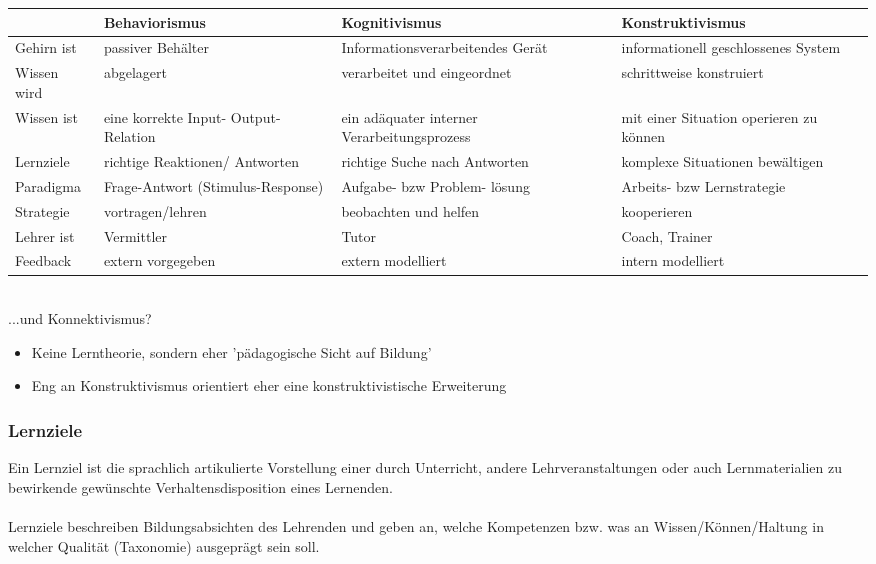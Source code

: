 \documentclass[a4paper]{article}
\begin{document}
\begin{tabular}{ p{2cm} p{4cm} p{4cm} p{4cm} }\toprule[1.5pt]			
	& \bf Behaviorismus
	& \bf Kognitivismus
	& \bf Konstruktivismus
	\\ \midrule
	
	Gehirn ist 				
	& passiver Behälter		   	
	& Informationsverarbeitendes Gerät
	& informationell geschlossenes System
	\\ 
	
	Wissen wird
	& abgelagert
	& verarbeitet und eingeordnet
	& schrittweise konstruiert
	\\ 
	
	Wissen ist
	& eine korrekte Input- Output-Relation
	& ein adäquater interner Verarbeitungsprozess
	& mit einer Situation operieren zu können
	\\ 
	
	Lernziele
	& richtige Reaktionen/ Antworten
	& richtige Suche nach Antworten
	& komplexe Situationen bewältigen
	\\ 
	
	Paradigma
	& Frage-Antwort (Stimulus-Response)
	& Aufgabe- bzw Problem- lösung
	& Arbeits- bzw Lernstrategie
	\\ 
	
	Strategie
	& vortragen/lehren
	& beobachten und helfen
	& kooperieren
	\\ 
	
	Lehrer ist
	& Vermittler
	& Tutor
	& Coach, Trainer
	\\ 
	
	Feedback
	& extern vorgegeben
	& extern modelliert
	& intern modelliert
	\\ 

	\bottomrule[1.5pt]
\end{tabular}
~\\
...und Konnektivismus?
\begin{itemize}
	\item Keine Lerntheorie, sondern eher 'pädagogische Sicht auf Bildung'
	\item Eng an Konstruktivismus orientiert \textrightarrow eher eine konstruktivistische Erweiterung
\end{itemize}

\subsubsection{Lernziele}

Ein Lernziel ist die sprachlich artikulierte Vorstellung einer durch Unterricht, andere Lehrveranstaltungen oder auch Lernmaterialien zu bewirkende gewünschte Verhaltensdisposition eines Lernenden.\\~\\
Lernziele beschreiben Bildungsabsichten des Lehrenden und geben an, welche Kompetenzen bzw. was an Wissen/Können/Haltung in welcher Qualität (Taxonomie) ausgeprägt sein soll.
\end{document}
